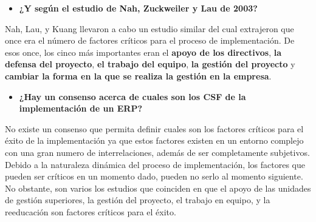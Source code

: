 \documentclass[11pt,a4paper]{article}
\begin{document}
\begin{itemize}
\item \textbf{¿Y según el estudio de Nah, Zuckweiler y Lau de 2003?}
\end{itemize}
Nah, Lau, y Kuang llevaron a cabo un estudio similar del cual extrajeron que once era el número de factores críticos para el proceso de implementación. De esos once, los cinco más importantes eran el \textbf{apoyo de los directivos}, \textbf{la defensa del proyecto}, \textbf{el trabajo del equipo}, \textbf{la gestión del proyecto} y  \textbf{cambiar la forma en la que se realiza la gestión en la empresa}.
\begin{itemize}
\item \textbf{¿Hay un consenso acerca de cuales son los CSF de la implementación de un ERP?}
\end{itemize}
No existe un consenso que permita definir cuales son los factores críticos para el éxito de la implementación ya que estos factores existen en un entorno complejo con una gran numero de interrelaciones, además de ser completamente subjetivos. Debido a la naturaleza dinámica del proceso de implementación, los factores que pueden ser críticos en un momento dado, pueden no serlo al momento siguiente. No obstante, son varios los estudios que coinciden en que el apoyo de las unidades de gestión superiores, la gestión del proyecto, el trabajo en equipo, y la reeducación son factores críticos para el éxito.
\end{document}
